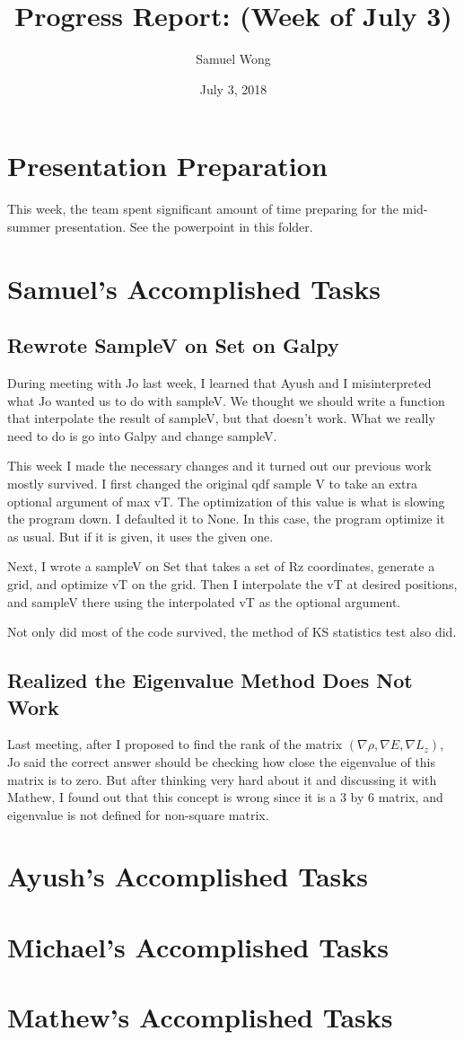 \documentclass[12pt]{article}
\begin{document}
\title{Progress Report: (Week of July 3)}
\author{Samuel Wong}
\date{July 3, 2018}
\maketitle

\section{Presentation Preparation}
This week, the team spent significant amount of time preparing for the mid-summer presentation. See the powerpoint in this folder.

\section{Samuel's Accomplished Tasks}
\subsection{Rewrote SampleV on Set on Galpy}
During meeting with Jo last week, I learned that Ayush and I misinterpreted what Jo wanted us to do with sampleV. We thought we should write a function that interpolate the result of sampleV, but that doesn't work. What we really need to do is go into Galpy and change sampleV.

This week I made the necessary changes and it turned out our previous work mostly survived. I first changed the original qdf sample V to take an extra optional argument of max vT. The optimization of this value is what is slowing the program down. I defaulted it to None. In this case, the program optimize it as usual. But if it is given, it uses the given one.

Next, I wrote a sampleV on Set that takes a set of Rz coordinates, generate a grid, and optimize vT on the grid. Then I interpolate the vT at desired positions, and sampleV there using the interpolated vT as the optional argument.

Not only did most of the code survived, the method of KS statistics test also did.
\subsection{Realized the Eigenvalue Method Does Not Work}
Last meeting, after I proposed to find the rank of the matrix $(\nabla \rho, \nabla E, \nabla L_z)$, Jo said the correct answer should be checking how close the eigenvalue of this matrix is to zero. But after thinking very hard about it and discussing it with Mathew, I found out that this concept is wrong since it is a 3 by 6 matrix, and eigenvalue is not defined for non-square matrix.

\section{Ayush’s Accomplished Tasks}
\section{Michael's Accomplished Tasks}
\section{Mathew's Accomplished Tasks}
\end{document}
